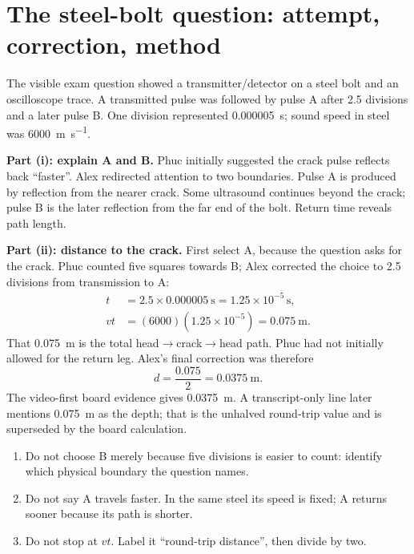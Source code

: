 \documentclass[11pt,a4paper]{article}
\begin{document}
\section{The steel-bolt question: attempt, correction, method}
The visible exam question showed a transmitter/detector on a steel bolt and an oscilloscope trace. A transmitted pulse was followed by pulse A after 2.5 divisions and a later pulse B. One division represented \SI{0.000005}{\second}; sound speed in steel was \SI{6000}{\metre\per\second}.

\begin{center}
\end{center}

\textbf{Part (i): explain A and B.} Phuc initially suggested the crack pulse reflects back ``faster''. Alex redirected attention to two boundaries. Pulse A is produced by reflection from the nearer crack. Some ultrasound continues beyond the crack; pulse B is the later reflection from the far end of the bolt. Return time reveals path length.

\textbf{Part (ii): distance to the crack.} First select A, because the question asks for the crack. Phuc counted five squares towards B; Alex corrected the choice to 2.5 divisions from transmission to A:
\begin{align*}
t&=2.5\times\SI{0.000005}{\second}=1.25\times10^{-5}\,\mathrm{s},\\
vt&=(6000)(1.25\times10^{-5})=\SI{0.075}{\metre}.
\end{align*}
That \SI{0.075}{\metre} is the total head$\to$crack$\to$head path. Phuc had not initially allowed for the return leg. Alex's final correction was therefore
\[
d=\frac{0.075}{2}=\boxed{\SI{0.0375}{\metre}}.
\]
The video-first board evidence gives \SI{0.0375}{\metre}. A transcript-only line later mentions \SI{0.075}{\metre} as the depth; that is the unhalved round-trip value and is superseded by the board calculation.

\begin{mistakebox}
\begin{enumerate}
\item Do not choose B merely because five divisions is easier to count: identify which physical boundary the question names.
\item Do not say A travels faster. In the same steel its speed is fixed; A returns sooner because its path is shorter.
\item Do not stop at $vt$. Label it ``round-trip distance'', then divide by two.
\end{enumerate}
\end{mistakebox}
\end{document}
